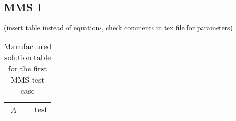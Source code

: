 

\subsection{MMS 1}

(insert table instead of equations, check comments in tex file for parameters)
\begin{table}[h!]
    \centering
    \begin{tabular}{c|r}
        $\bar{A}$ & test
    \end{tabular}
    \caption{Manufactured solution table for the first MMS test case}
    \label{tab:MMS1_input}
\end{table}






